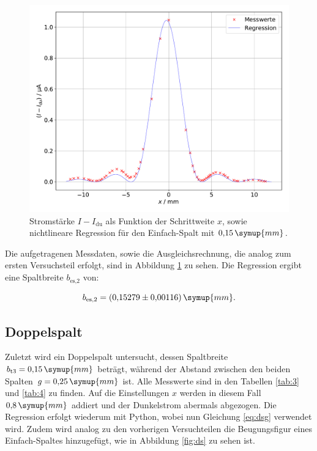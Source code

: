 \begin{figure}[h!tbp]
	\centering
	\includegraphics[width=1\linewidth]{es2.pdf}
	\caption{Stromstärke $I-I_{\text{du}}$ als Funktion der Schrittweite $x$, sowie nichtlineare Regression für den Einfach-Spalt mit $0{,}15\,\symup{mm}$.}
	\label{fig:es2}
\end{figure}

Die aufgetragenen Messdaten, sowie die Ausgleichsrechnung, die analog zum ersten Versuchsteil erfolgt, sind in Abbildung \ref{fig:es2} zu sehen.
Die Regression ergibt eine Spaltbreite $b_{\text{es,2}}$ von:

\begin{equation*}
b_{\text{es,2}} = (0{,}15279\pm 0{,}00116)\,\symup{mm}.
\end{equation*}



\subsection{Doppelspalt}

Zuletzt wird ein Doppelspalt untersucht, dessen Spaltbreite $b_{\text{t3}} = 0{,}15\,\symup{mm}$ beträgt, während der Abstand zwischen den beiden Spalten $g = 0{,}25\,\symup{mm}$ ist.
Alle Messwerte sind in den Tabellen \ref{tab:3} und \ref{tab:4} zu finden.
Auf die Einstellungen $x$ werden in diesem Fall $0{,}8\,\symup{mm}$ addiert und der Dunkelstrom abermals abgezogen. 
Die Regression erfolgt wiederum mit Python, wobei nun Gleichung \ref{eq:dsg} verwendet wird. Zudem wird analog zu den vorherigen Versuchteilen die Beugungsfigur eines Einfach-Spaltes hinzugefügt, wie in Abbildung \ref{fig:ds} zu sehen ist.



